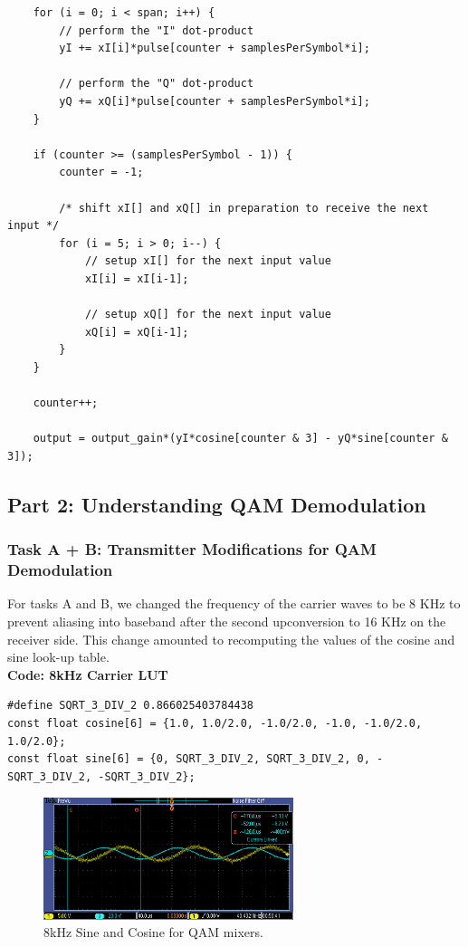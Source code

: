 \documentclass{article}
\begin{document}
\begin{verbatim}
	for (i = 0; i < span; i++) {
		// perform the "I" dot-product
		yI += xI[i]*pulse[counter + samplesPerSymbol*i];	

		// perform the "Q" dot-product
		yQ += xQ[i]*pulse[counter + samplesPerSymbol*i];	
	}

	if (counter >= (samplesPerSymbol - 1)) {
		counter = -1; 

		/* shift xI[] and xQ[] in preparation to receive the next input */
		for (i = 5; i > 0; i--) {
			// setup xI[] for the next input value
			xI[i] = xI[i-1];  

			// setup xQ[] for the next input value
			xQ[i] = xQ[i-1];  
		}
	}

	counter++;

	output = output_gain*(yI*cosine[counter & 3] - yQ*sine[counter & 3]);
\end{verbatim}

\subsection{Part 2: Understanding QAM Demodulation}

\subsubsection{Task A + B: Transmitter Modifications for QAM Demodulation}
For tasks A and B, we changed the frequency of the carrier waves to be 8 KHz to prevent aliasing into baseband after the second upconversion to 16 KHz on the receiver side. This change amounted to recomputing the values of the cosine and sine look-up table.\\

\textbf{Code: 8kHz Carrier LUT}
\begin{verbatim}
#define SQRT_3_DIV_2 0.866025403784438
const float cosine[6] = {1.0, 1.0/2.0, -1.0/2.0, -1.0, -1.0/2.0, 1.0/2.0};
const float sine[6] = {0, SQRT_3_DIV_2, SQRT_3_DIV_2, 0, -SQRT_3_DIV_2, -SQRT_3_DIV_2};
\end{verbatim}

\begin{figure}[h]
  \begin{center}
    \includegraphics[width=0.65\textwidth]{img/task_2_b_oscilloscope.png}
    \caption{8kHz Sine and Cosine for QAM mixers.}
  \end{center}
\end{figure}
\end{document}
